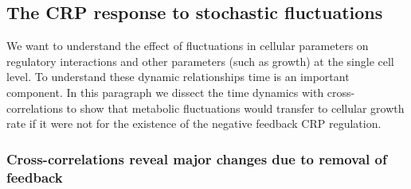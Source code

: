 \subsection{The CRP response to stochastic fluctuations}
\label{CRP:txt:CCsAndModel}

We want to understand the effect of fluctuations in cellular parameters on regulatory interactions and other parameters (such as growth) at the single cell level.
%
To understand these dynamic relationships time is an important component.
%
%
In this paragraph we dissect the time dynamics with cross-correlations
to show that metabolic fluctuations would transfer to cellular growth rate if it were not for the existence of the negative feedback CRP regulation.

\subsubsection{Cross-correlations reveal major changes due to removal of feedback}

